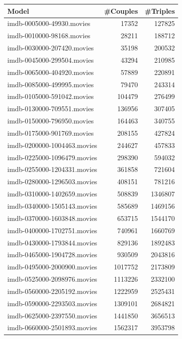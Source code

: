 \documentclass[a4paper,11pt]{article}
\begin{document}
\begin{table}[h!]
  \centering
  \begin{tabular}{| l | r | r |}
  \hline
  \textbf{Model}              & \textbf{\#Couples} & \textbf{\#Triples}\\
  \hline
  imdb-0005000-49930.movies   & 17352 & 127825\\
  imdb-0010000-98168.movies   & 28211 & 188712\\
  imdb-0030000-207420.movies  & 35198 & 200532\\
  imdb-0045000-299504.movies  & 43294 & 210985\\
  imdb-0065000-404920.movies  & 57889 & 220891\\
  imdb-0085000-499995.movies  & 79470 & 243314\\
  imdb-0105000-591042.movies  & 104479 & 276499\\
  imdb-0130000-709551.movies  & 136956 & 307405\\
  imdb-0150000-796950.movies  & 164463 & 340755\\
  imdb-0175000-901769.movies  & 208155 & 427824\\
  imdb-0200000-1004463.movies & 244627 & 457833\\
  imdb-0225000-1096479.movies & 298390 & 594032\\
  imdb-0255000-1204331.movies & 361858 & 721604\\
  imdb-0280000-1296503.movies & 408151 & 781216\\
  imdb-0310000-1402659.movies & 508839 & 1346807\\
  imdb-0340000-1505143.movies & 585689 & 1469156\\
  imdb-0370000-1603848.movies & 653715 & 1544170\\
  imdb-0400000-1702751.movies & 740961 & 1660769\\
  imdb-0430000-1793844.movies & 829136 & 1892483\\
  imdb-0465000-1904728.movies & 930509 & 2043816\\
  imdb-0495000-2000900.movies & 1017752 & 2173809\\
  imdb-0525000-2098976.movies & 1113226 & 2332100\\
  imdb-0560000-2205192.movies & 1222959 & 2525431\\
  imdb-0590000-2293503.movies & 1309101 & 2684821\\
  imdb-0625000-2397550.movies & 1441850 & 3656513\\
  imdb-0660000-2501893.movies & 1562317 & 3953798\\

\end{tabular}
\end{table}
\end{document}
